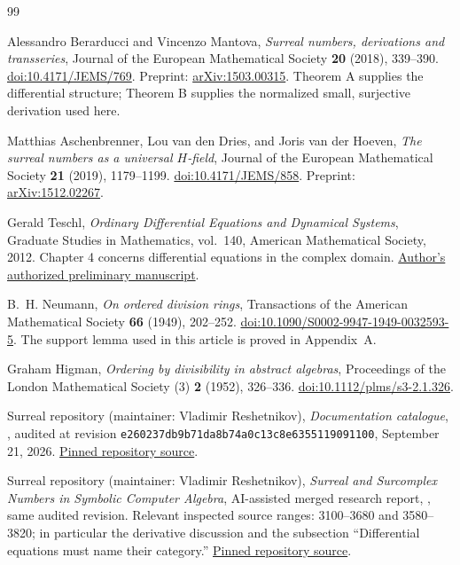 \documentclass[11pt,letterpaper]{article}
\numberwithin{equation}{section}
\theoremstyle{definition}
\theoremstyle{remark}
\begin{document}
\clearpage
{}
{}
\begin{thebibliography}{99}
\raggedright

Alessandro Berarducci and Vincenzo Mantova,
\emph{Surreal numbers, derivations and transseries},
Journal of the European Mathematical Society \textbf{20} (2018), 339--390.
\href{https://doi.org/10.4171/JEMS/769}{doi:10.4171/JEMS/769}.
Preprint: \href{https://arxiv.org/abs/1503.00315}{arXiv:1503.00315}.
Theorem A supplies the differential structure; Theorem B supplies the
normalized small, surjective derivation used here.

Matthias Aschenbrenner, Lou van den Dries, and Joris van der Hoeven,
\emph{The surreal numbers as a universal $H$-field},
Journal of the European Mathematical Society \textbf{21} (2019), 1179--1199.
\href{https://doi.org/10.4171/JEMS/858}{doi:10.4171/JEMS/858}.
Preprint: \href{https://arxiv.org/abs/1512.02267}{arXiv:1512.02267}.

Gerald Teschl,
\emph{Ordinary Differential Equations and Dynamical Systems},
Graduate Studies in Mathematics, vol.~140, American Mathematical Society,
2012. Chapter 4 concerns differential equations in the complex domain.
\href{https://www.mat.univie.ac.at/~gerald/ftp/book-ode/ode.pdf}
{Author's authorized preliminary manuscript}.

B.~H. Neumann,
\emph{On ordered division rings},
Transactions of the American Mathematical Society \textbf{66} (1949),
202--252.
\href{https://doi.org/10.1090/S0002-9947-1949-0032593-5}
{doi:10.1090/S0002-9947-1949-0032593-5}.
The support lemma used in this article is proved in Appendix~A.

Graham Higman,
\emph{Ordering by divisibility in abstract algebras},
Proceedings of the London Mathematical Society (3) \textbf{2} (1952),
326--336.
\href{https://doi.org/10.1112/plms/s3-2.1.326}
{doi:10.1112/plms/s3-2.1.326}.

Surreal repository (maintainer: Vladimir Reshetnikov),
\emph{Documentation catalogue},
, audited at revision
\texttt{e260237db9b71da8b74a0c13c8e6355119091100}, September 21, 2026.
\href{https://github.com/VladimirReshetnikov/Surreal/blob/e260237db9b71da8b74a0c13c8e6355119091100/docs/README.md}
{Pinned repository source}.

Surreal repository (maintainer: Vladimir Reshetnikov),
\emph{Surreal and Surcomplex Numbers in Symbolic
Computer Algebra}, AI-assisted merged research report,
,
same audited revision. Relevant inspected source ranges: 3100--3680 and
3580--3820; in particular the derivative discussion and the subsection
``Differential equations must name their category.''
\href{https://github.com/VladimirReshetnikov/Surreal/blob/e260237db9b71da8b74a0c13c8e6355119091100/docs/foundations-and-computation/computer-algebra/article.tex}
{Pinned repository source}.


\end{thebibliography}
\end{document}
